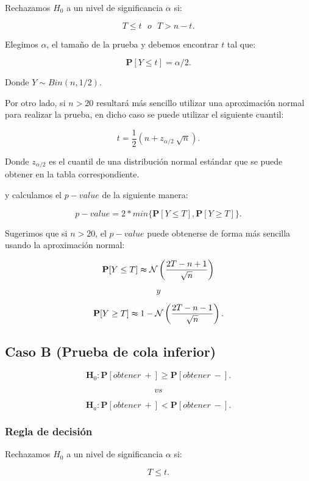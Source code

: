 \documentclass[
  a4paper,
  oneside,
  openany]{book}
\begin{document}
Rechazamos \(H_0\) a un nivel de significancia \(\alpha\) si:

\[T \leq t \ \ \  o \ \ \ T>n-t.\]

Elegimos \(\alpha\), el tamaño de la prueba y debemos encontrar \(t\) tal que:

\[\mathbf{P}[Y \leq t]=\alpha/2.\]

Donde \(Y \sim Bin (n,1/2)\).

Por otro lado, si \(n>20\) resultará más sencillo utilizar una aproximación normal para realizar la prueba, en dicho caso se puede utilizar el siguiente cuantil:

\[t=\frac{1}{2}\left(n+z_{\alpha/2}\ \sqrt{n}\right).\]

Donde \(z_{\alpha/2}\) es el cuantil de una distribución normal estándar que se puede obtener en la tabla correspondiente.

y calculamos el \(p-value\) de la siguiente manera:

\[p-value=2*min\{\mathbf{P}[Y\leq T],\mathbf{P}[Y\geq T]\}.\]

Sugerimos que si \(n > 20\), el \(p-value\) puede obtenerse de forma más sencilla usando la aproximación normal:

\[\mathbf{P}[Y\leq T] \thickapprox  \mathcal{N}\left(\frac{2T-n+1}{\sqrt{n}}\right)\]

\[y\]

\[\mathbf{P}[Y\geq T] \thickapprox 1- \mathcal{N} \left(\frac{2T-n-1}{\sqrt{n}}\right).\]

\hypertarget{caso-b-prueba-de-cola-inferior-2}{%
\subsection*{Caso B (Prueba de cola inferior)}\label{caso-b-prueba-de-cola-inferior-2}}


\[\textbf{H}_0: \mathbf{P}[obtener\ +] \geq \mathbf{P}[obtener\ -].\]

\[vs\]

\[\textbf{H}_a: \mathbf{P}[obtener\ +] < \mathbf{P}[obtener\ -].\]

\hypertarget{regla-de-decisiuxf3n-7}{%
\subsubsection*{Regla de decisión}\label{regla-de-decisiuxf3n-7}}


Rechazamos \(H_0\) a un nivel de significancia \(\alpha\) si:

\[T \leq t.\]
\end{document}
